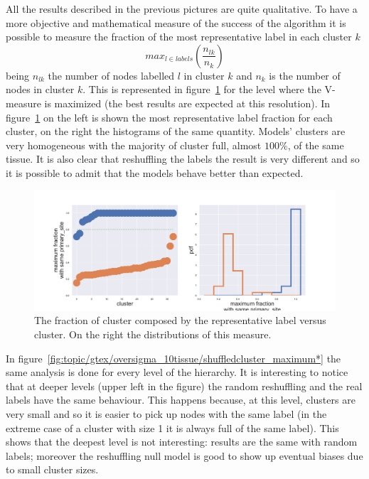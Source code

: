 All the results described in the previous pictures are quite qualitative. To have a more objective and mathematical measure of the success of the algorithm it is possible to measure the fraction of the most representative label in each cluster $k$
\[
max_{l\in labels}\left(\frac{n_{l k}}{n_k}\right)
\]
being $n_{l k}$ the number of nodes labelled $l$ in cluster $k$ and $n_k$ is the number of nodes in cluster $k$. This is represented in figure~\ref{fig:gtex/oversigma_10tissue/shuffledcluster_maximum_l2_primary_site} for the level where the V-measure is maximized (the best results are expected at this resolution). In figure~\ref{fig:gtex/oversigma_10tissue/shuffledcluster_maximum_l2_primary_site} on the left is shown the most representative label fraction for each cluster, on the right the histograms of the same quantity. Models' clusters are very homogeneous with the majority of cluster full, almost $100\%$, of the same tissue. It is also clear that reshuffling the labels the result is very different and so it is possible to admit that the models behave better than expected. 
\begin{figure}[htb!]
    \centering
    \includegraphics[width=0.9\linewidth]{pictures/topic/gtex/oversigma_10tissue/shuffledcluster_maximum_l2_primary_site.pdf}
    \caption{The fraction of cluster composed by the representative label versus cluster. On the right the distributions of this measure.}
    \label{fig:gtex/oversigma_10tissue/shuffledcluster_maximum_l2_primary_site}
\end{figure}
In figure~\ref{fig:topic/gtex/oversigma_10tissue/shuffledcluster_maximum*} the same analysis is done for every level of the hierarchy. It is interesting to notice that at deeper levels (upper left in the figure) the random reshuffling and the real labels have the same behaviour. This happens because, at this level, clusters are very small and so it is easier to pick up nodes with the same label (in the extreme case of a cluster with size 1 it is always full of the same label). This shows that the deepest level is not interesting: results are the same with random labels; moreover the reshuffling null model is good to show up eventual biases due to small cluster sizes.
